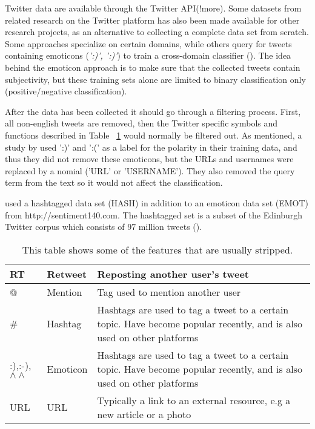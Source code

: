 Twitter data are available through the Twitter API(!more). Some datasets from related research on the Twitter platform has also been made available for other research projects, as an alternative to collecting a complete data set from scratch. Some approaches specialize on certain domains, while others query for tweets containing emoticons (\emph{':)', ':)'}) to train a cross-domain classifier  (\cite{article:go}). The idea behind the emoticon approach is to make sure that the collected tweets contain subjectivity, but these training sets alone are limited to binary classification only (positive/negative classification).

After the data has been collected it should go through a filtering process. First, all non-english tweets are removed, then the Twitter specific symbols and functions described in Table ~\ref{tab:features} would normally be filtered out. As mentioned, a study by \cite{article:go} used ':)' and ':(' as a label for the polarity in their training data, and thus they did not remove these emoticons, but the URLs and usernames were replaced by a nomial ('URL' or 'USERNAME'). They also removed the query term from the text so it would not affect the classification.

\cite{article:omg} used a hashtagged data set (HASH) in addition to an emoticon data set (EMOT) from http://sentiment140.com. The hashtagged set is a subset of the Edinburgh Twitter corpus which consists of 97 million tweets (\cite{article:edinburgh}).

\begin{table}[]
\centering
\label{tab:features}
\begin{tabular}{|l|l|p{8cm}|}
\hline
RT & Retweet & Reposting another user’s tweet \\ \hline
@ & Mention & Tag used to mention another user \\ \hline
\# & Hashtag & Hashtags are used to tag a tweet to a certain topic. Have become popular recently, and is also used on other platforms \\ \hline
:),:-),$\wedge\wedge$ & Emoticon & Hashtags are used to tag a tweet to a certain topic. Have become popular recently, and is also used on other platforms \\ \hline
URL & URL & Typically a link to an external resource, e.g a new article or a photo \\ \hline
\end{tabular}
\caption{This table shows some of the features that are usually stripped.}
\end{table}

